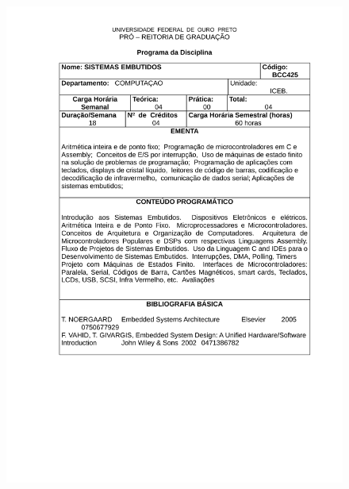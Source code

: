 \begin{figure}[p]
	\centering 
	\includegraphics[scale=0.7]{capitulos/anexo1-programas-disciplina/p71.pdf}
\end{figure}

